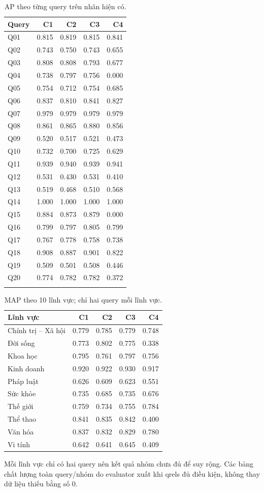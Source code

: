 \begin{longtable}{|l|r|r|r|r|}
\hline
Query & C1 & C2 & C3 & C4 \\
\hline
\endhead
Q01 & 0.815 & 0.819 & 0.815 & 0.841 \\
Q02 & 0.743 & 0.750 & 0.743 & 0.655 \\
Q03 & 0.808 & 0.808 & 0.793 & 0.677 \\
Q04 & 0.738 & 0.797 & 0.756 & 0.000 \\
Q05 & 0.754 & 0.712 & 0.754 & 0.685 \\
Q06 & 0.837 & 0.810 & 0.841 & 0.827 \\
Q07 & 0.979 & 0.979 & 0.979 & 0.979 \\
Q08 & 0.861 & 0.865 & 0.880 & 0.856 \\
Q09 & 0.520 & 0.517 & 0.521 & 0.473 \\
Q10 & 0.732 & 0.700 & 0.725 & 0.629 \\
Q11 & 0.939 & 0.940 & 0.939 & 0.941 \\
Q12 & 0.531 & 0.430 & 0.531 & 0.410 \\
Q13 & 0.519 & 0.468 & 0.510 & 0.568 \\
Q14 & 1.000 & 1.000 & 1.000 & 1.000 \\
Q15 & 0.884 & 0.873 & 0.879 & 0.000 \\
Q16 & 0.799 & 0.797 & 0.805 & 0.799 \\
Q17 & 0.767 & 0.778 & 0.758 & 0.738 \\
Q18 & 0.908 & 0.887 & 0.901 & 0.822 \\
Q19 & 0.509 & 0.501 & 0.508 & 0.446 \\
Q20 & 0.774 & 0.782 & 0.782 & 0.372 \\
\hline
\caption{AP theo từng query trên nhãn hiện có.} \\
\end{longtable}

\begin{table}[htbp]
\centering
\begin{tabular}{|p{}|r|r|r|r|}
\hline
Lĩnh vực & C1 & C2 & C3 & C4 \\
\hline
Chính trị – Xã hội & 0.779 & 0.785 & 0.779 & 0.748 \\
Đời sống & 0.773 & 0.802 & 0.775 & 0.338 \\
Khoa học & 0.795 & 0.761 & 0.797 & 0.756 \\
Kinh doanh & 0.920 & 0.922 & 0.930 & 0.917 \\
Pháp luật & 0.626 & 0.609 & 0.623 & 0.551 \\
Sức khỏe & 0.735 & 0.685 & 0.735 & 0.676 \\
Thế giới & 0.759 & 0.734 & 0.755 & 0.784 \\
Thể thao & 0.841 & 0.835 & 0.842 & 0.400 \\
Văn hóa & 0.837 & 0.832 & 0.829 & 0.780 \\
Vi tính & 0.642 & 0.641 & 0.645 & 0.409 \\
\hline
\end{tabular}
\caption{MAP theo 10 lĩnh vực; chỉ hai query mỗi lĩnh vực.}
\end{table}

Mỗi lĩnh vực chỉ có hai query nên kết quả nhóm chưa đủ để suy rộng. Các bảng chất lượng toàn query/nhóm do evaluator xuất khi qrels đủ điều kiện, không thay dữ liệu thiếu bằng số 0.
